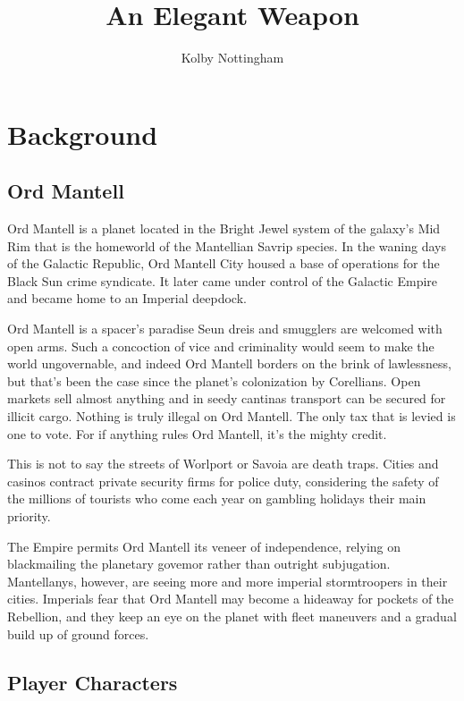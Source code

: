 \documentclass[letterpaper]{article}
\title{An Elegant Weapon}
\author{Kolby Nottingham}
\begin{document}
\maketitle

\section{Background}

\subsection{Ord Mantell}

Ord Mantell is a planet located in the Bright Jewel system of the galaxy's Mid Rim that is the homeworld of the Mantellian Savrip species. In the waning days of the Galactic Republic, Ord Mantell City housed a base of operations for the Black Sun crime syndicate. It later came under control of the Galactic Empire and became home to an Imperial deepdock.

Ord Mantell is a spacer's paradise Seun dreis and smugglers are welcomed with open arms. Such a concoction of vice and criminality would seem to make the world ungovernable, and indeed Ord Mantell borders on the brink of lawlessness, but that's been the case since the planet's colonization by Corellians. Open markets sell almost anything and in seedy cantinas transport can be secured for illicit cargo. Nothing is truly illegal on Ord Mantell. The only tax that is levied is one to vote. For if anything rules Ord Mantell, it's the mighty credit.

This is not to say the streets of Worlport or Savoia are death traps. Cities and casinos contract private security firms for police duty, considering the safety of the millions of tourists who come each year on gambling holidays their main priority. 

The Empire permits Ord Mantell its veneer of independence, relying on blackmailing the planetary govemor rather than outright subjugation. Mantellanys, however, are seeing more and more imperial stormtroopers in their cities. Imperials fear that Ord Mantell may become a hideaway for pockets of the Rebellion, and they keep an eye on the planet with fleet maneuvers and a gradual build up of ground forces.

\subsection{Player Characters}
\end{document}
